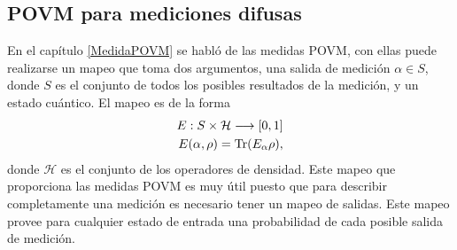\begin{comment}
De igual forma, sea $R$ el conjunto de pares ordenados $(i,l)$ de los índices de valores propios tales que su primer índice indica un valor propio del operador $A$ y el segundo índice indica algún valor propio del operador $B$. Sus respectivos operadores de proyección tienen la característica que  $|a_i b_l\rala a_i b_l|=|b_l a_i \rala b_l a_i |$, Los valores que toman $j$ y $k$ pueden ser $0$ o $1$. El operador de proyección asociado a los valores propios indexados por los elementos del conjunto $R$ es \[P^r_{a_i,b_l}=|a_i b_l\rala a_i b_l|=|b_l a_i \rala b_l a_i |.\] Luego, con una probabilidad $q$ el instrumento cuántico es \[\sum_{m,n} P_{a_m,b_n}\otimes P_{a_m,b_n}\rho P_{a_m,b_n},\] con $m,n=1,0$ y con una probabilidad $(1-q)$ es \[\sum_{(i,l)\in R} P_{a_i, b_l}\otimes  P^{r}_{a_i,b_l}\rho P^r_{a_i,n_l}+\sum_{(j,k)\in S}P_{a_j b_k} \otimes  \dfrac{1}{2}P^{s}_{a_j,b_k}\rho P^s_{a_j,b_k}.\]

Si el estado inicial se encuentra en el subespacio de $P^{s}_{a_j,b_k}$, el factor $(1/2)$ en la segunda sumatoria es la probabilidad con la que el sistema clásico indica  que el estado está en $|a_j b_k\ra $ o en $|b_k a_j\ra$. El instrumento es la suma convexa de estos dos posibilidades \begin{equation}
    \begin{split}
        \mathcal{I}_3(\rho)&=q\sum_{m,n}  P_{a_m,b_n}\otimes P_{a_m,b_n}\rho P_{a_m,b_n} +(1-q)\sum_{(i,l)\in R} P_{a_i, b_l}\otimes  P^{r}_{a_i,b_l}\rho P^r_{a_i,b_l}\\
        &+(1-q)\sum_{(j,k)\in S}P_{a_j,b_k} \otimes  \dfrac{1}{2}P^{s}_{a_j,b_k}\rho P^s_{a_j,b_k}.\\
    \end{split}
\end{equation}  
\end{comment}
\subsection{POVM para mediciones difusas}\label{Sec_POVM_para_mediciones_difusas} %

En el capítulo {\ref{MedidaPOVM}} se habló de las medidas POVM, con ellas puede
realizarse un mapeo que toma dos argumentos, una salida de medición $\alpha \in
S $, donde $S$ es el conjunto de todos los posibles resultados de la medición,
y un estado cuántico. El mapeo es de la forma 
\begin{equation}\begin{split}
    E:S\times \mathcal{H}\longrightarrow [0,1]\\
    E(\alpha,\rho)={\rm Tr}(E_\alpha\rho),
\end{split}\end{equation}
donde $\mathcal{H}$ es el conjunto de los operadores de densidad. Este mapeo
que proporciona las medidas POVM es muy útil puesto que para describir
completamente una medición es necesario tener un mapeo de salidas. Este mapeo
provee para cualquier estado de entrada una probabilidad de cada posible salida
de medición. 


